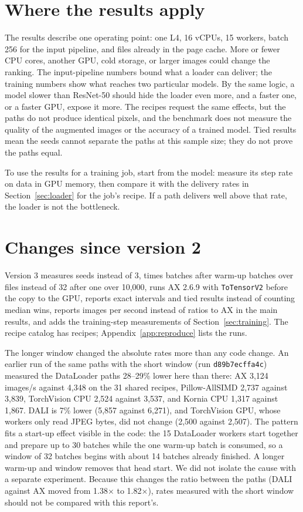 \documentclass[11pt]{article}
\begin{document}
\section{Where the results apply}

The results describe one operating point: one L4, 16 vCPUs, 15 workers, batch 256 for the input
pipeline, and files already in the page cache. More or fewer CPU cores, another GPU, cold storage,
or larger images could change the ranking. The input-pipeline numbers bound what a loader can
deliver; the training numbers show what reaches two particular models. By the same logic, a model
slower than ResNet-50 should hide the loader even more, and a faster one, or a faster GPU, expose
it more. The recipes request the same effects, but the paths do not produce identical pixels, and
the benchmark does not measure the quality of the augmented images or the accuracy of a trained
model. Tied results mean the seeds cannot separate the paths at this sample size; they do not
prove the paths equal.

To use the results for a training job, start from the model: measure its step rate on data in GPU
memory, then compare it with the delivery rates in Section~\ref{sec:loader} for the job's recipe.
If a path delivers well above that rate, the loader is not the bottleneck.

\section{Changes since version 2}

Version 3 measures \SeedCount{} seeds instead of 3, times \MeasuredBatches{} batches after \WarmupBatches{} warm-up batches
over \DatasetFiles{} files instead of 32 after one over 10,000, runs AX 2.6.9 with \texttt{ToTensorV2} before
the copy to the GPU, reports exact intervals and tied results instead of counting median wins,
reports images per second instead of ratios to AX in the main results, and adds the
training-step measurements of Section~\ref{sec:training}. The recipe catalog has
\RecipeCount{} recipes; Appendix~\ref{app:reproduce} lists the runs.

The longer window changed the absolute rates more than any code change. An earlier run of the same
paths with the short window (run \texttt{d89b7ecffa4c}) measured the DataLoader paths 28--29\% lower
here than there: AX 3,124 images/s against 4,348 on the 31 shared recipes, Pillow-AllSIMD 2,737
against 3,839, TorchVision CPU 2,524 against 3,537, and Kornia CPU 1,317 against 1,867. DALI is
7\% lower (5,857 against 6,271), and TorchVision GPU, whose workers only read JPEG bytes, did not
change (2,500 against 2,507). The pattern fits a start-up effect visible in the code: the 15
DataLoader workers start together and prepare up to 30 batches while the one warm-up batch is
consumed, so a window of 32 batches begins with about 14 batches already finished. A longer warm-up
and window removes that head start. We did not isolate the cause with a separate experiment. Because
this changes the ratio between the paths (DALI against AX moved from 1.38$\times$ to
1.82$\times$), rates measured with the short window should not be compared with this report's.
\end{document}
